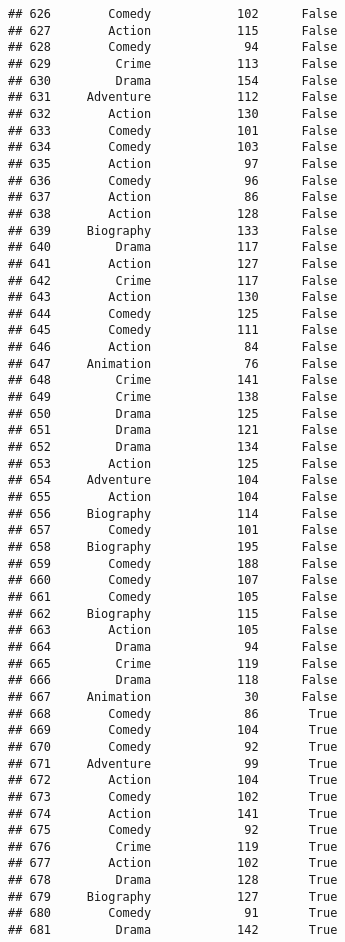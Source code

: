 \documentclass[
]{article}
\begin{document}
\begin{verbatim}
## 626        Comedy            102      False
## 627        Action            115      False
## 628        Comedy             94      False
## 629         Crime            113      False
## 630         Drama            154      False
## 631     Adventure            112      False
## 632        Action            130      False
## 633        Comedy            101      False
## 634        Comedy            103      False
## 635        Action             97      False
## 636        Comedy             96      False
## 637        Action             86      False
## 638        Action            128      False
## 639     Biography            133      False
## 640         Drama            117      False
## 641        Action            127      False
## 642         Crime            117      False
## 643        Action            130      False
## 644        Comedy            125      False
## 645        Comedy            111      False
## 646        Action             84      False
## 647     Animation             76      False
## 648         Crime            141      False
## 649         Crime            138      False
## 650         Drama            125      False
## 651         Drama            121      False
## 652         Drama            134      False
## 653        Action            125      False
## 654     Adventure            104      False
## 655        Action            104      False
## 656     Biography            114      False
## 657        Comedy            101      False
## 658     Biography            195      False
## 659        Comedy            188      False
## 660        Comedy            107      False
## 661        Comedy            105      False
## 662     Biography            115      False
## 663        Action            105      False
## 664         Drama             94      False
## 665         Crime            119      False
## 666         Drama            118      False
## 667     Animation             30      False
## 668        Comedy             86       True
## 669        Comedy            104       True
## 670        Comedy             92       True
## 671     Adventure             99       True
## 672        Action            104       True
## 673        Comedy            102       True
## 674        Action            141       True
## 675        Comedy             92       True
## 676         Crime            119       True
## 677        Action            102       True
## 678         Drama            128       True
## 679     Biography            127       True
## 680        Comedy             91       True
## 681         Drama            142       True

\end{verbatim}
\end{document}
